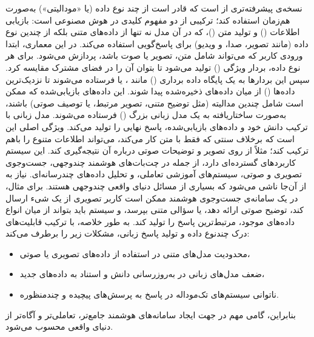 \documentclass{article}
\begin{document}
 نسخه‌ی پیشرفته‌تری از  است که قادر است از چند نوع داده (یا «مودالیتی») به‌صورت هم‌زمان استفاده کند؛
 ترکیبی از دو مفهوم کلیدی در هوش مصنوعی است: بازیابی اطلاعات () و تولید متن ()، که در آن مدل نه تنها از داده‌های متنی بلکه از چندین نوع داده (مانند تصویر، صدا، و ویدیو) برای پاسخ‌گویی استفاده می‌کند.
در این معماری، ابتدا ورودی کاربر که می‌تواند شامل متن، تصویر یا صوت باشد، پردازش می‌شود.
برای هر نوع داده، بردار ویژگی () تولید می‌شود تا بتوان آن را در فضای مشترک مقایسه کرد.
سپس این بردارها به یک پایگاه داده برداری () مانند ،  یا  فرستاده می‌شوند تا نزدیک‌ترین داده‌ها () از میان داده‌های ذخیره‌شده پیدا شوند.
این داده‌های بازیابی‌شده که ممکن است شامل چندین مدالیته (مثل توضیح متنی، تصویر مرتبط، یا توصیف صوتی) باشند، به‌صورت ساختاریافته به یک مدل زبانی بزرگ () فرستاده می‌شوند.
مدل زبانی با ترکیب دانش خود و داده‌های بازیابی‌شده، پاسخ نهایی را تولید می‌کند.
ویژگی اصلی  این است که برخلاف  سنتی که فقط با متن کار می‌کند، می‌تواند اطلاعات متنوع را باهم ترکیب کند؛
مثلاً از روی تصویر و توضیحات صوتی درباره آن نتیجه‌گیری کند.
این سیستم کاربردهای گسترده‌ای دارد، از جمله در چت‌بات‌های هوشمند چندوجهی، جست‌وجوی تصویری و صوتی، سیستم‌های آموزشی تعاملی، و تحلیل داده‌های چندرسانه‌ای.
نیاز به  از آن‌جا ناشی می‌شود که بسیاری از مسائل دنیای واقعی چندوجهی هستند.
برای مثال، در یک سامانه‌ی جست‌وجوی هوشمند ممکن است کاربر تصویری از یک شیء ارسال کند، توضیح صوتی ارائه دهد، یا سؤالی متنی بپرسد، و سیستم باید بتواند از میان انواع داده‌های موجود، مرتبط‌ترین پاسخ را تولید کند.
به طور خلاصه،  با ترکیب قابلیت‌های درک چندنوع داده و تولید پاسخ زبانی، مشکلات زیر را برطرف می‌کند:
\begin{itemize}
\item محدودیت مدل‌های متنی در استفاده از داده‌های تصویری یا صوتی،
\item ضعف مدل‌های زبانی در به‌روزرسانی دانش و استناد به داده‌های جدید،
\item ناتوانی سیستم‌های تک‌موداله در پاسخ به پرسش‌های پیچیده و چندمنظوره.
\end{itemize}

بنابراین،  گامی مهم در جهت ایجاد سامانه‌های هوشمند جامع‌تر، تعاملی‌تر و آگاه‌تر از دنیای واقعی محسوب می‌شود.
\end{document}

